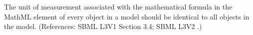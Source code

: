 The unit of measurement associated with the mathematical formula in the
MathML  element of every \KineticLaw object in a model should
be identical to all \KineticLaw objects in the model.  (References: SBML L3V1 Section 3.4; SBML
L3V2 .)
